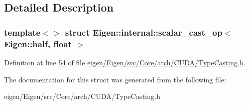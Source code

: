 \subsection{Detailed Description}
\subsubsection*{template$<$$>$\newline
struct Eigen\+::internal\+::scalar\+\_\+cast\+\_\+op$<$ Eigen\+::half, float $>$}



Definition at line \hyperlink{eigen_2_eigen_2src_2_core_2arch_2_c_u_d_a_2_type_casting_8h_source_l00054}{54} of file \hyperlink{eigen_2_eigen_2src_2_core_2arch_2_c_u_d_a_2_type_casting_8h_source}{eigen/\+Eigen/src/\+Core/arch/\+C\+U\+D\+A/\+Type\+Casting.\+h}.



The documentation for this struct was generated from the following file\+:\begin{DoxyCompactItemize}
\item 
eigen/\+Eigen/src/\+Core/arch/\+C\+U\+D\+A/\+Type\+Casting.\+h\end{DoxyCompactItemize}
